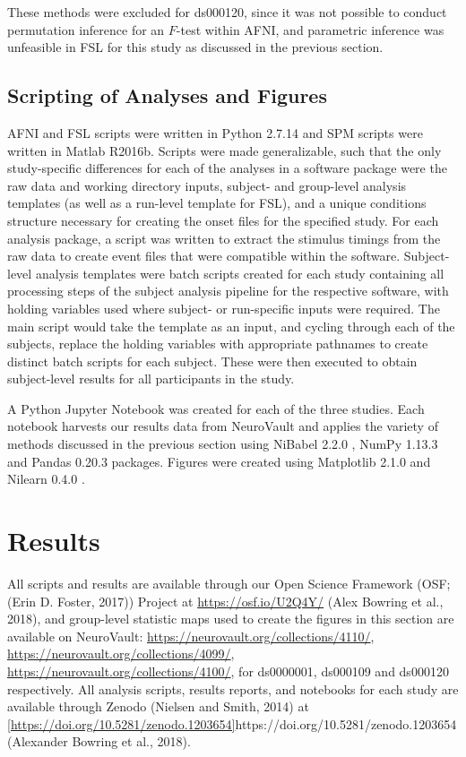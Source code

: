 These methods were excluded for ds000120, since it was not possible to conduct permutation inference for an $F$-test within AFNI, and parametric inference was unfeasible in FSL for this study as discussed in the previous section. 

\subsection{Scripting of Analyses and Figures}
AFNI and FSL scripts were written in Python 2.7.14 and SPM scripts were written in Matlab R2016b. Scripts were made generalizable, such that the only study-specific differences for each of the analyses in a software package were the raw data and working directory inputs, subject- and group-level analysis templates (as well as a run-level template for FSL), and a unique conditions structure necessary for creating the onset files for the specified study. For each analysis package, a script was written to extract the stimulus timings from the raw data to create event files that were compatible within the software. Subject-level analysis templates were batch scripts created for each study containing all processing steps of the subject analysis pipeline for the respective software, with holding variables used where subject- or run-specific inputs were required. The main script would take the template as an input, and cycling through each of the subjects, replace the holding variables with appropriate pathnames to create distinct batch scripts for each subject. These were then executed to obtain subject-level results for all participants in the study. 

A Python Jupyter Notebook \citep{Kluyver2016-yl} was created for each of the three studies. Each notebook harvests our results data from NeuroVault and applies the variety of methods discussed in the previous section using NiBabel 2.2.0 \citep{Brett2017-zb}, NumPy 1.13.3 \citep{Walt2011-db} and Pandas 0.20.3 \citep{McKinney2010-dv} packages. Figures were created using Matplotlib 2.1.0 \citep{Hunter2007-nu} and Nilearn 0.4.0 \citep{Abraham2014-ap}. 

\section{Results}

All scripts and results are available through our Open Science Framework (OSF; (Erin D. Foster, 2017)) Project at \href{https://osf.io/U2Q4Y/}{https://osf.io/U2Q4Y/} (Alex Bowring et al., 2018), and group-level statistic maps used to create the figures in this section are available on NeuroVault: \href{https://neurovault.org/collections/4110/}{https://neurovault.org/collections/4110/}, \href{https://neurovault.org/collections/4099/}{https://neurovault.org/collections/4099/}, \href{https://neurovault.org/collections/4100/}{https://neurovault.org/collections/4100/}, for ds0000001, ds000109 and ds000120 respectively. All analysis scripts, results reports, and notebooks for each study are available through Zenodo (Nielsen and Smith, 2014) at \ref{https://doi.org/10.5281/zenodo.1203654}{https://doi.org/10.5281/zenodo.1203654} (Alexander Bowring et al., 2018).


